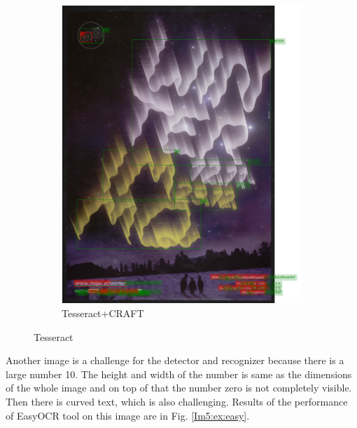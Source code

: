 \begin{figure}[hbtp!]
\begin{subfigure}{0.5\textwidth}
        \label{Im4:ex:easy}
    \end{subfigure}
    \begin{subfigure}{0.45\textwidth}
        \includegraphics[scale=0.3]{obrazky/plakaty/result_carfttesseract_vienna1_split_special_snesitive-73.png}
        \caption{Tesseract+CRAFT}
        \label{Im4:ex:craft}
    \end{subfigure}

    \caption{Tesseract}
    \label{Im4:ex:compl}
\end{figure}

Another image %
is a challenge for the detector and recognizer because there is a large number 10. The height and width of the number is same as the dimensions of the whole image and on top of that the number zero is not completely visible. Then there is curved text, which is also challenging. Results of the performance of EasyOCR tool on this image are in Fig. \ref*{Im5:ex:easy}.

